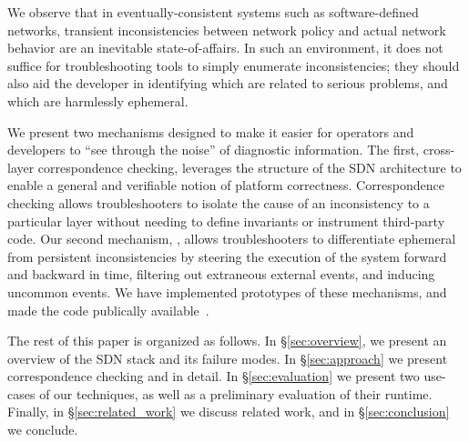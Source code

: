 We observe that in eventually-consistent systems such as software-defined
networks, transient inconsistencies between network policy and actual network
behavior are an inevitable state-of-affairs.
In such an environment, it does not suffice for troubleshooting tools to
simply enumerate inconsistencies; they should also aid the developer
in identifying which are related to serious problems, and which are
harmlessly ephemeral.

We present two mechanisms designed to make it easier for operators and
developers to ``see through the noise'' of diagnostic information. The first,
cross-layer correspondence checking, leverages the structure of the SDN
architecture to enable a general and verifiable notion of platform
correctness. Correspondence checking allows troubleshooters to isolate the
cause of 
an inconsistency to a particular layer without needing to define invariants or
instrument third-party code. Our second
mechanism, \simulator, allows troubleshooters 
to differentiate ephemeral from persistent inconsistencies by steering the
execution of the system forward and backward in time, filtering out extraneous
external events, and inducing uncommon events. We have implemented prototypes
of these mechanisms, and made the code publically available~\cite{github}.

The rest of this paper is organized as follows. In \S\ref{sec:overview},
we present an overview of the SDN stack and its failure modes.
In \S\ref{sec:approach} we present correspondence checking and
\simulator in detail. In \S\ref{sec:evaluation} we present
two use-cases of our techniques, as well as a preliminary evaluation
of their runtime. Finally, in \S\ref{sec:related_work} we discuss related work,
and in \S\ref{sec:conclusion} we conclude.
